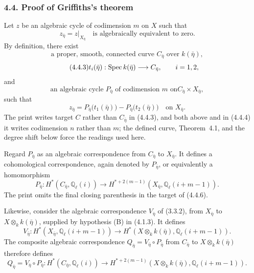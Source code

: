 \subsubsection*{4.4. Proof of Griffiths's theorem}

Let $z$ be an algebraic cycle of codimension $m$ on $X$ such that
\begin{equation}\tag{4.4.1}
z_{\bar\eta}=z|_{X_{\bar\eta}}
\quad\text{is algebraically equivalent to zero}.
\end{equation}
By definition, there exist
\begin{equation}\tag{4.4.2}
\text{a proper, smooth, connected curve $C_{\bar\eta}$ over $k(\bar\eta)$},
\end{equation}
\begin{equation}\tag{4.4.3}
t_i(\bar\eta):\operatorname{Spec} k(\bar\eta)\longrightarrow C_{\bar\eta},
\qquad i=1,2,
\end{equation}
and
\begin{equation}\tag{4.4.4}
\text{an algebraic cycle $P_{\bar\eta}$ of codimension $m$ on
$C_{\bar\eta}\times X_{\bar\eta}$},
\end{equation}
such that
\begin{equation}\tag{4.4.5}
z_{\bar\eta}
=P_{\bar\eta}\bigl(t_1(\bar\eta)\bigr)
-P_{\bar\eta}\bigl(t_2(\bar\eta)\bigr)
\quad\text{on }X_{\bar\eta}.
\end{equation}
The print writes target $C$ rather than $C_{\bar\eta}$ in (4.4.3), and
both above and in (4.4.4) it writes codimension $n$ rather than $m$;
the defined curve, Theorem~4.1, and the degree shift below force the
readings used here.

Regard $P_{\bar\eta}$ as an algebraic correspondence from
$C_{\bar\eta}$ to $X_{\bar\eta}$.  It defines a cohomological
correspondence, again denoted by $P_{\bar\eta}$, or equivalently a
homomorphism
\begin{equation}\tag{4.4.6}
P_{\bar\eta}:H^*(C_{\bar\eta},\mathbb Q_\ell(i))
\longrightarrow
H^{*+2(m-1)}(X_{\bar\eta},\mathbb Q_\ell(i+m-1)).
\end{equation}
The print omits the final closing parenthesis in the target of (4.4.6).

Likewise, consider the algebraic correspondence $V_{\bar\eta}$ of
(3.3.2), from $X_{\bar\eta}$ to $X\otimes_k k(\bar\eta)$, supplied by
hypothesis (B) in (4.1.3).  It defines
\begin{equation}\tag{4.4.7}
V_{\bar\eta}:H^*(X_{\bar\eta},\mathbb Q_\ell(i+m-1))
\longrightarrow
H^*(X\otimes_k k(\bar\eta),\mathbb Q_\ell(i+m-1)).
\end{equation}
The composite algebraic correspondence
$Q_{\bar\eta}=V_{\bar\eta}\circ P_{\bar\eta}$ from $C_{\bar\eta}$ to
$X\otimes_k k(\bar\eta)$ therefore defines
\begin{equation}\tag{4.4.8}
Q_{\bar\eta}=V_{\bar\eta}\circ P_{\bar\eta}:
H^*(C_{\bar\eta},\mathbb Q_\ell(i))
\longrightarrow
H^{*+2(m-1)}(X\otimes_k k(\bar\eta),\mathbb Q_\ell(i+m-1)).
\end{equation}

